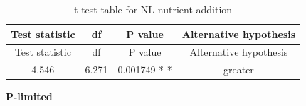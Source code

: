 \documentclass[]{article}
\begin{document}
\begin{longtable}[]{@{}cccc@{}}
\caption{t-test table for NL nutrient addition}\tabularnewline
\toprule
\begin{minipage}[b]{0.21\columnwidth}\centering\strut
Test statistic
\strut\end{minipage} &
\begin{minipage}[b]{0.07\columnwidth}\centering\strut
df
\strut\end{minipage} &
\begin{minipage}[b]{0.16\columnwidth}\centering\strut
P value
\strut\end{minipage} &
\begin{minipage}[b]{0.30\columnwidth}\centering\strut
Alternative hypothesis
\strut\end{minipage}\tabularnewline
\midrule
\endfirsthead
\toprule
\begin{minipage}[b]{0.21\columnwidth}\centering\strut
Test statistic
\strut\end{minipage} &
\begin{minipage}[b]{0.07\columnwidth}\centering\strut
df
\strut\end{minipage} &
\begin{minipage}[b]{0.16\columnwidth}\centering\strut
P value
\strut\end{minipage} &
\begin{minipage}[b]{0.30\columnwidth}\centering\strut
Alternative hypothesis
\strut\end{minipage}\tabularnewline
\midrule
\endhead
\begin{minipage}[t]{0.21\columnwidth}\centering\strut
4.546
\strut\end{minipage} &
\begin{minipage}[t]{0.07\columnwidth}\centering\strut
6.271
\strut\end{minipage} &
\begin{minipage}[t]{0.16\columnwidth}\centering\strut
0.001749 * *
\strut\end{minipage} &
\begin{minipage}[t]{0.30\columnwidth}\centering\strut
greater
\strut\end{minipage}\tabularnewline
\bottomrule
\end{longtable}

\textbf{P-limited}
\end{document}
